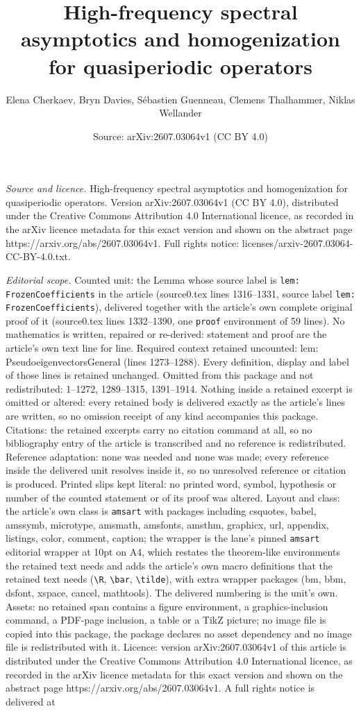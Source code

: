 \documentclass[10pt,a4paper]{amsart}
\title[High-frequency spectral asymptotics and homogenization for q]{High-frequency spectral asymptotics and homogenization for quasiperiodic operators}
\author{Elena Cherkaev, Bryn Davies, S\'ebastien Guenneau, Clemens Thalhammer, Niklas Wellander}
\date{Source: arXiv:2607.03064v1 (CC BY 4.0)}
\begin{document}
\maketitle

\noindent\emph{Source and licence.} High-frequency spectral asymptotics and homogenization for quasiperiodic operators. Version arXiv:2607.03064v1 (CC BY 4.0), distributed under the Creative Commons Attribution 4.0 International licence, as recorded in the arXiv licence metadata for this exact version and shown on the abstract page https://arxiv.org/abs/2607.03064v1. Full rights notice: licenses/arxiv-2607.03064-CC-BY-4.0.txt.\par\smallskip

\noindent\textit{Editorial scope.} Counted unit: the Lemma whose source label is \texttt{lem: FrozenCoefficients} in the article (source0.tex lines 1316--1331, source label \texttt{lem: FrozenCoefficients}), delivered together with the article's own complete original proof of it (source0.tex lines 1332--1390, one \texttt{proof} environment of 59 lines). No mathematics is written, repaired or re-derived: statement and proof are the article's own text line for line. Required context retained uncounted: lem: PseudoeigenvectorsGeneral (lines 1273--1288). Every definition, display and label of those lines is retained unchanged. Omitted from this package and not redistributed: 1--1272, 1289--1315, 1391--1914. Nothing inside a retained excerpt is omitted or altered: every retained body is delivered exactly as the article's lines are written, so no omission receipt of any kind accompanies this package. Citations: the retained excerpts carry no citation command at all, so no bibliography entry of the article is transcribed and no reference is redistributed. Reference adaptation: none was needed and none was made; every reference inside the delivered unit resolves inside it, so no unresolved reference or citation is produced. Printed slips kept literal: no printed word, symbol, hypothesis or number of the counted statement or of its proof was altered. Layout and class: the article's own class is \texttt{amsart} with packages including csquotes, babel, amssymb, microtype, amsmath, amsfonts, amsthm, graphicx, url, appendix, listings, color, comment, caption; the wrapper is the lane's pinned \texttt{amsart} editorial wrapper at 10pt on A4, which restates the theorem-like environments the retained text needs and adds the article's own macro definitions that the retained text needs (\texttt{\textbackslash R}, \texttt{\textbackslash bar}, \texttt{\textbackslash tilde}), with extra wrapper packages (bm, bbm, dsfont, xspace, cancel, mathtools). The delivered numbering is the unit's own. Assets: no retained span contains a figure environment, a graphics-inclusion command, a PDF-page inclusion, a table or a TikZ picture; no image file is copied into this package, the package declares no asset dependency and no image file is redistributed with it. Licence: version arXiv:2607.03064v1 of this article is distributed under the Creative Commons Attribution 4.0 International licence, as recorded in the arXiv licence metadata for this exact version and shown on the abstract page https://arxiv.org/abs/2607.03064v1. A full rights notice is delivered at 
\end{document}

